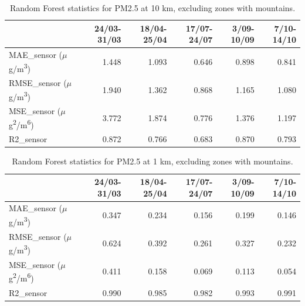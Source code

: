 \begin{table}[H]
\begin{tabular}{lrrrrr}
\toprule
  &  24/03-31/03 &  18/04-25/04 &  17/07-24/07 &  3/09-10/09 &  7/10-14/10 \\
\midrule
  MAE\_sensor ($\mu$g/m\textsuperscript{3}) &        1.448 &        1.093 &        0.646 &       0.898 &       0.841 \\
RMSE\_sensor ($\mu$g/m\textsuperscript{3}) &        1.940 &        1.362 &        0.868 &       1.165 &       1.080 \\
 MSE\_sensor ($\mu$g\textsuperscript{2}/m\textsuperscript{6}) &        3.772 &        1.874 &        0.776 &       1.376 &       1.197 \\
  R2\_sensor  &        0.872 &        0.766 &        0.683 &       0.870 &       0.793 \\
\bottomrule
\end{tabular}
\caption{Random Forest statistics for PM2.5 at 10 km, excluding zones with mountains.}
\label{tab:res10km}
\end{table}
\begin{table}[H]
\begin{tabular}{lrrrrr}
\toprule
  &  24/03-31/03 &  18/04-25/04 &  17/07-24/07 &  3/09-10/09 &  7/10-14/10 \\
\midrule
  MAE\_sensor ($\mu$g/m\textsuperscript{3}) &        0.347 &        0.234 &        0.156 &       0.199 &       0.146 \\
RMSE\_sensor ($\mu$g/m\textsuperscript{3}) &        0.624 &        0.392 &        0.261 &       0.327 &       0.232 \\
 MSE\_sensor ($\mu$g\textsuperscript{2}/m\textsuperscript{6}) &        0.411 &        0.158 &        0.069 &       0.113 &       0.054 \\
  R2\_sensor  &        0.990 &        0.985 &        0.982 &       0.993 &       0.991 \\
\bottomrule
\end{tabular}
\caption{Random Forest statistics for PM2.5 at 1 km, excluding zones with mountains.}
\label{tab:res1km}
\end{table}

